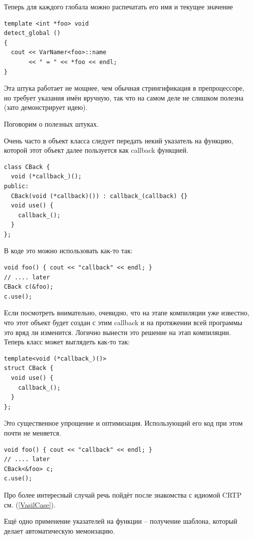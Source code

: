\documentclass[a4paper,12pt,oneside]{article}
\begin{document}
Теперь для каждого глобала можно распечатать его имя и текущее значение

\begin{lstlisting}
template <int *foo> void
detect_global ()
{
  cout << VarNamer<foo>::name
       << " = " << *foo << endl;
}
\end{lstlisting}

Эта штука работает не мощнее, чем обычная стрингификация в препроцессоре, но требует указания имён вручную, так что на самом деле не слишком полезна (зато демонстрирует идею).

Поговорим о полезных штуках.

Очень часто в объект класса следует передать некий указатель на функцию, которой этот объект далее пользуется как callback функцией.

\begin{lstlisting}
class CBack {
  void (*callback_)();
public:
  CBack(void (*callback)()) : callback_(callback) {}
  void use() {
    callback_();
  }
}; 
\end{lstlisting}

В коде это можно использовать как-то так:

\begin{lstlisting}
void foo() { cout << "callback" << endl; }
// .... later
CBack c(&foo);
c.use();
\end{lstlisting}

Если посмотреть внимательно, очевидно, что на этапе компиляции уже известно, что этот объект будет создан с этим callback и на протяжении всей программы это вряд ли изменится. Логично вынести это решение на этап компиляции. Теперь класс может выглядеть как-то так:

\begin{lstlisting}
template<void (*callback_)()>
struct CBack {
  void use() {
    callback_();
  }
}; 
\end{lstlisting}

Это существенное упрощение и оптимизация. Использующий его код при этом почти не меняется.

\begin{lstlisting}
void foo() { cout << "callback" << endl; }
// .... later
CBack<&foo> c;
c.use();
\end{lstlisting}

Про более интересный случай речь пойдёт после знакомства с идиомой CRTP см. (\ref{VasilCase}).

Ещё одно применение указателей на функции -- получение шаблона, который делает автоматическую мемоизацию.
\end{document}
